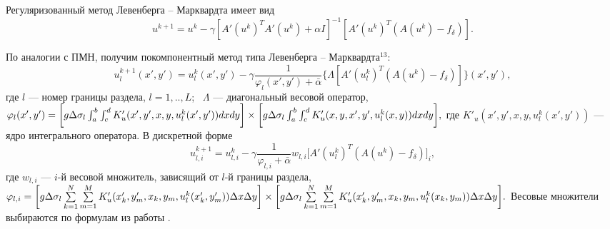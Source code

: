 \documentclass[%
autoref,     %
href,        %
colorlinks,  %
]{disser}
\begin{document}
Регуляризованный метод Левенберга -- Марквардта имеет вид 
$$u^{k+1}=u^k-\gamma[A'(u^k)^T A'(u^k)+\alpha I]^{-1} [A'(u^k)^T(A(u^k)-f_\delta)].$$

По аналогии с ПМН, получим покомпонентный метод типа Левенберга -- Марквардта$^{13}$:
$$ u_l^{k+1}(x',y')=u_l^k(x',y')-\gamma\frac{1}{\varphi_l(x',y')+\bar{\alpha}}\big\{\Lambda[ A'(u_l^k)^T(A(u^k)-f_\delta)]\big\}(x',y'),$$
где $l$ --- номер границы раздела, $l=1,..,L$;~ $\Lambda$ --- диагональный весовой оператор, 
$\varphi_l(x',y')=\bigg[ g\Delta\sigma_l\int_{a}^{b}\int_{c}^{d}
K'_u(x', y', x, y, u_l^k(x',y'))dxdy\bigg] \notag \\ \times\bigg[g\Delta\sigma_l\int_{a}^{b}\int_{c}^{d}K'_u(x,y, x',y',u_l^k(x,y))dxdy\bigg], $
где $K'_u(x',y', x, y, u_l^k(x',y'))$ --- ядро интегрального оператора.
{\scriptsize
\let\thefootnote\relax\let\thefootnote\relax{}}
В дискретной форме
\begin{equation*}\label{comp_lm_meth_disc}
u_{l,i}^{k+1}=u_{l,i}^k-\gamma\frac{1}{\varphi_{l,i}+\bar{\alpha}}w_{l,i}\big[ A'(u_l^k)^T(A(u^k)-f_\delta)\big]_i,
\end{equation*}
где $w_{l,i}$ --- $i$-й весовой множитель, зависящий от $l$-й границы раздела,\\
$
\varphi_{l,i}=\bigg[ g\Delta\sigma_l\sum\limits_{k=1}^{N}
\sum\limits_{m=1}^{M}
K'_u(x'_k,y'_m, x_k, y_m, u_l^k(x'_k,y'_m)) \Delta x \Delta y\bigg] \notag \\ \times\bigg[g\Delta\sigma_l\sum\limits_{k=1}^{N}
\sum\limits_{m=1}^{M}K'_u(x'_k, y'_m, x_k,y_m, u_l^k(x_k,y_m))\Delta x \Delta y\bigg]. \\
$
Весовые множители выбираются по формулам из работы \cite{AkMisSkurTre2015_2}. 
\end{document}
